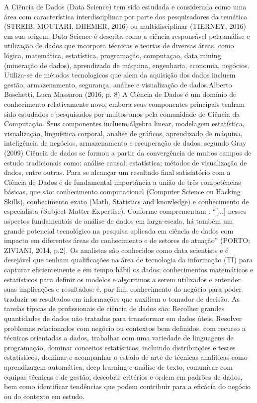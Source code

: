   A Ciência de Dados (Data Science) tem sido estudada e considerada como uma área com característica interdisciplinar por parte dos pesquisadores da temática (STREIB, MOUTARI, DHEMER, 2016) ou multidisciplinar (TIERNEY, 2016) em sua origem.  Data Science é descrita como a ciência responsável pela análise e utilização de dados que incorpora técnicas e teorias de diversas áreas, como lógica, matemática, estatística, programação, computaçao, data mining (mineração de dados), aprendizado de máquina, engenharia, economia, negócios. Utiliza-se de métodos tecnologicos que alem da aquisição dos dados  incluem gestão, armazenamento, segurança, análise e visualização de dados.Alberto Boschetti, Luca Massaron (2016, p. 8) A Ciência de Dados é um domínio de conhecimento relativamente novo, embora seus componentes principais tenham sido estudados e pesquisados por muitos anos pela comunidade de Ciência da Computação. Seus componentes incluem álgebra linear, modelagem estatística, visualização, linguística corporal, analise de gráficos, aprendizado de máquina, inteligência de negócios, armazenamento e recuperação de dados. segundo Gray (2009)  Ciência de dados se formou a partir da convergência de muitos campos de estudo tradicionais como: análise causal; estatística; métodos de visualização de dados, entre outras. Para se alcançar um resultado final satisfatório com a Ciência de Dados é de fundamental importância a união de três competências básicas, que são: conhecimento computacional (Computer Science ou Hacking Skills), conhecimento exato (Math, Statistics and knowledge) e conhecimento de especialista (Subject Matter Expertise).  Conforme comprementam : “[...] nesses aspectos fundamentais de análise de dados em larga-escala, há também um grande potencial tecnológico na pesquisa aplicada em ciência de dados com impacto em diferentes áreas do conhecimento e de setores de atuação” (PORTO; ZIVIANI, 2014, p.2). Os analistas são conhecidos como data scientists e é desejável que tenham qualificações na área de tecnologia da informação (TI) para capturar eficientemente e em tempo hábil os dados; conhecimentos matemáticos e estatísticos para definir os modelos e algoritmos a serem utilizados e entender suas implicações e resultados; e, por fim, conhecimento do negócio para poder traduzir os resultados em informações que auxiliem o tomador de decisão. As tarefas típicas de profissionais de ciência de dados são: Recolher grandes quantidades de dados não tratadas para transformar em dados úteis,  Resolver problemas relacionados com negócio ou contextos bem definidos, com recurso a técnicas orientadas a dados, trabalhar com uma variedade de linguagens de programação, dominar conceitos estatísticos, incluindo distribuições e testes estatísticos, dominar e acompanhar o estado de arte de técnicas analíticas como aprendizagem automática, deep learning e análise de texto, comunicar com equipas técnicas e de gestão, descobrir critérios e ordem em padrões de dados, bem como identificar tendências que podem contribuir para a eficácia do negócio ou do contexto em estudo.

